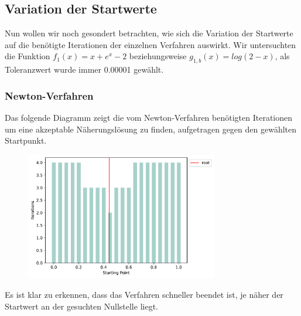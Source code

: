 \documentclass[a4paper,12pt]{article}
\newcommand{\1}{1\hspace{-0,9ex}1}
\begin{document}
\newpage
\subsection*{Variation der Startwerte}
Nun wollen wir noch gesondert betrachten, wie sich die Variation der Startwerte auf die benötigte Iterationen der einzelnen Verfahren auswirkt. Wir untersuchten die Funktion $f_1(x)=x+e^x-2$ beziehungsweise $g_{1,b}(x)=log(2-x)$, als Toleranzwert wurde immer 0.00001 gewählt.
\subsubsection*{Newton-Verfahren}
Das folgende Diagramm zeigt die vom Newton-Verfahren benötigten Iterationen um eine akzeptable Näherungslösung zu finden, aufgetragen gegen den gewählten Startpunkt.
\begin{figure}[H]
	\centering
	\includegraphics[width=0.75\textwidth]{plots/newton_iterations_by_starting_point.pdf}
\end{figure}
Es ist klar zu erkennen, dass das Verfahren schneller beendet ist, je näher der Startwert an der gesuchten Nullstelle liegt.
\end{document}
